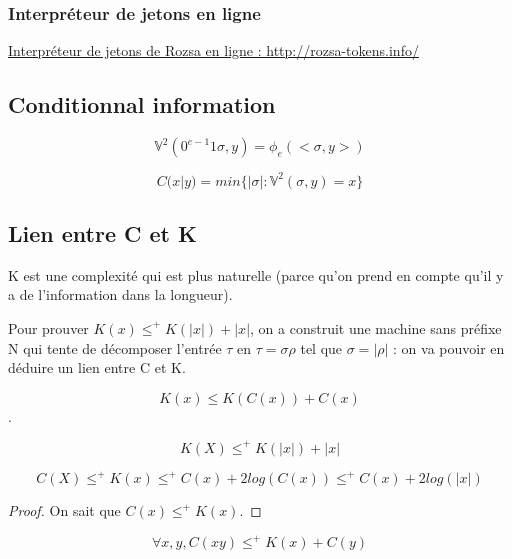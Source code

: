 	\subsubsection{Interpréteur de jetons en ligne}

\href{http://rozsa-tokens.info/}{Interpréteur de jetons de Rozsa en ligne : http://rozsa-tokens.info/}

\subsection{Conditionnal information}

\begin{definition}
$$\mathbb{V}^2(0^{e-1}1\sigma,y)=\phi_e(<\sigma,y>)$$
\end{definition}

\begin{definition}
$$C(x|y) = min\{|\sigma|:\mathbb{V}^2(\sigma,y)=x\}$$
\end{definition}

\subsection{Lien entre C et K}

\par K est une complexité qui est plus naturelle (parce qu'on prend en compte qu'il y a de l'information dans la longueur).
\par Pour prouver $K(x) \leqslant^+ K(|x|)+|x|$, on a construit une machine sans préfixe N qui tente de décomposer l'entrée $\tau$ en $\tau=\sigma\rho$ tel que $\sigma = |\rho|$ : on va pouvoir en déduire un lien entre C et K.

\begin{theorem}
$$K(x)\leqslant K(C(x))+C(x)$$.
\end{theorem}

\begin{theorem}
$$K(X) \leqslant^+ K(|x|)+|x|$$
\end{theorem}

\begin{theorem}
$$C(X) \leqslant^+ K(x) \leqslant^+ C(x) + 2 log(C(x)) \leqslant^+ C(x)+2log(|x|)$$
\end{theorem}

\begin{proof}
On sait que $C(x) \leqslant^+ K(x).$
\end{proof}

\begin{theorem}
$$\forall x,y, C(xy) \leqslant^+ K(x) + C(y)$$
\end{theorem}

